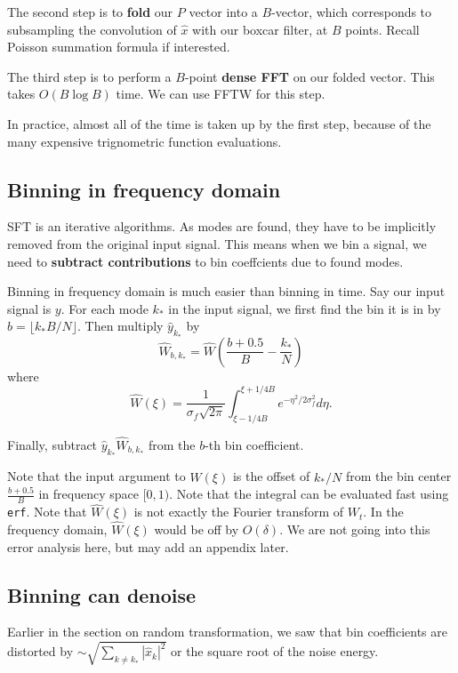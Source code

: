 \documentclass[10pt]{article}
\begin{document}
The second step is to \textbf{fold} our $P$ vector into a $B$-vector, which corresponds to subsampling the convolution of $\hat{x}$ with our boxcar filter, at $B$ points. Recall Poisson summation formula if interested.

The third step is to perform a $B$-point \textbf{dense FFT} on our folded vector. This takes $O(B\log B)$ time. We can use FFTW for this step.

In practice, almost all of the time is taken up by the first step, because of the many expensive trignometric function evaluations.

\subsection{Binning in frequency domain}

SFT is an iterative algorithms. As modes are found, they have to be implicitly removed from the original input signal. This means when we bin a signal, we need to \textbf{subtract contributions} to bin coeffcients due to found modes.

Binning in frequency domain is much easier than binning in time. Say our input signal is $y$. For each mode $k_*$ in the input signal, we first find the bin it is in by $b = \lfloor k_* B/N \rfloor$. Then multiply $\hat{y}_{k_*}$ by
$$\hat{W}_{b,k_*} = \hat{W}\left(\frac{b+0.5}{B}-\frac{k_*}{N}\right)$$
where
$$\hat{W}(\xi)=\frac{1}{\sigma_f \sqrt{2\pi}} \int_{\xi-1/4B}^{\xi+1/4B} e^{-\eta^2/2\sigma_f^2} d\eta.$$

Finally, subtract $\hat{y}_{k_*} \hat{W}_{b,k_*}$ from the $b$-th bin coefficient.

Note that the input argument to $\hat{W}(\xi)$ is the offset of $k_*/N$ from the bin center $\frac{b+0.5}{B}$ in frequency space $[0,1)$.  Note that the integral can be evaluated fast using \texttt{erf}. Note that $\hat{W}(\xi)$ is not exactly the Fourier transform of $W_t$. In the frequency domain, $\hat{W}(\xi)$ would be off by $O(\delta)$. We are not going into this error analysis here, but may add an appendix later.

\subsection{Binning can denoise}

Earlier in the section on random transformation, we saw that bin coefficients are distorted by $\sim \sqrt{\sum_{k\neq k_*} |\hat{x}_k|^2}$ or the square root of the noise energy.
\end{document}
